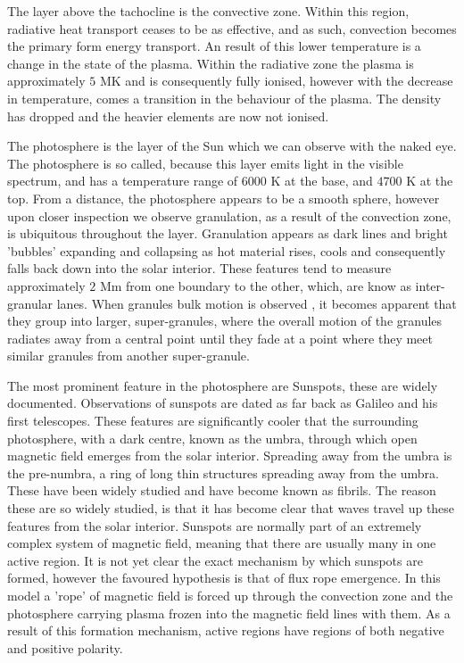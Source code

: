 The layer above the tachocline is the convective zone.
Within this region, radiative heat transport ceases to be as effective, and as such, convection becomes the primary form energy transport.
An result of this lower temperature is a change in the state of the plasma.
Within the radiative zone the plasma is approximately $5$ MK and is consequently fully ionised, however with the decrease in temperature, comes a transition in the behaviour of the plasma.
The density has dropped and the heavier elements are now not ionised.
 


The photosphere is the layer of the Sun which we can observe with the naked eye.
The photosphere is so called, because this layer emits light in the visible spectrum, and has a temperature range of $6000$ K at the base, and $4700$ K at the top. 
From a distance, the photosphere appears to be a smooth sphere, however upon closer inspection we observe granulation, as a result of the convection zone, is ubiquitous throughout the layer.
Granulation appears as dark lines and bright 'bubbles' expanding and collapsing as hot material rises, cools and consequently falls back down into the solar interior.
These features tend to measure approximately $2$ Mm from one boundary to the other, which, are know as inter-granular lanes.
When granules bulk motion is observed , it becomes apparent that they group into larger, super-granules, where the overall motion of the granules radiates away from a central point until they fade at a point where they meet similar granules from another super-granule.

The most prominent feature in the photosphere are Sunspots, these are widely documented.
Observations of sunspots are dated as far back as Galileo and his first telescopes.
These features are significantly cooler that the surrounding photosphere, with a dark centre, known as the umbra, through which open magnetic field emerges from the solar interior.
Spreading away from the umbra is the pre-numbra, a ring of long thin structures spreading away from the umbra.
These have been widely studied and have become known as fibrils.
The reason these are so widely studied, is that it has become clear that waves travel up these features from the solar interior.
Sunspots are normally part of an extremely complex system of magnetic field, meaning that there are usually many in one active region.
It is not yet clear the exact mechanism by which sunspots are formed, however the favoured hypothesis is that of flux rope emergence.
In this model a 'rope' of magnetic field is forced up through the convection zone and the photosphere carrying plasma frozen into the magnetic field lines with them.
As a result of this formation mechanism, active regions have regions of both negative and positive polarity.


